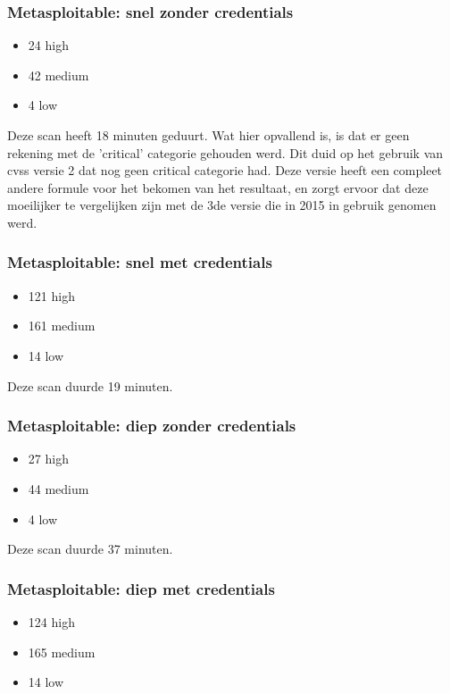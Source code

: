 \subsubsection{Metasploitable: snel zonder credentials}

\begin{itemize}
\item 24 high
\item 42 medium
\item 4 low
\end{itemize}

Deze scan heeft 18 minuten geduurt. Wat hier opvallend is, is dat er geen rekening met de 'critical' categorie gehouden werd. Dit duid op het gebruik van cvss versie 2 dat nog geen critical categorie had. Deze versie heeft een compleet andere formule voor het bekomen van het resultaat, en zorgt ervoor dat deze moeilijker te vergelijken zijn met de 3de versie die in 2015 in gebruik genomen werd.

\subsubsection{Metasploitable: snel met credentials}

\begin{itemize}
\item 121 high
\item 161 medium
\item 14 low
\end{itemize}

Deze scan duurde 19 minuten.

\subsubsection{Metasploitable: diep zonder credentials}

\begin{itemize}
\item 27 high
\item 44 medium
\item 4 low
\end{itemize}

Deze scan duurde 37 minuten.

\subsubsection{Metasploitable: diep met credentials}

\begin{itemize}
\item 124 high
\item 165 medium
\item 14 low
\end{itemize}


